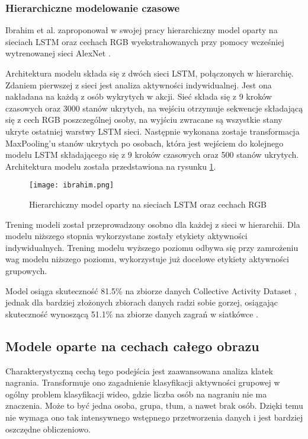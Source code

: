 \subsubsection{Hierarchiczne modelowanie czasowe} 
Ibrahim et al. \cite{Ibrahim2015} zaproponował w swojej pracy hierarchiczny model oparty na sieciach LSTM oraz cechach RGB wyekstrahowanych przy pomocy wcześniej wytrenowanej sieci AlexNet \cite{alexnet}. 

Architektura modelu składa się z dwóch sieci LSTM, połączonych w hierarchię. Zdaniem pierwszej z sieci jest analiza aktywności indywidualnej. Jest ona nakładana na każdą z osób wykrytych w akcji. Sieć składa się z 9 kroków czasowych oraz 3000 stanów ukrytych, na wejściu otrzymuje sekwencje składającą się z cech RGB poszczególnej osoby, na wyjściu zwracane są wszystkie stany ukryte ostatniej warstwy LSTM sieci. Następnie wykonana zostaje transformacja MaxPooling'u stanów ukrytych po osobach, która jest wejściem do kolejnego modelu LSTM składającego się z 9 kroków czasowych oraz 500 stanów ukrytych. Architektura modelu została przedstawiona na rysunku \ref{fig:ibrahim-arch}. 
\begin{figure}[!h]
    \centering \texttt{[image: ibrahim.png]}
    \caption{Hierarchiczny model oparty na sieciach LSTM oraz cechach RGB}
    \label{fig:ibrahim-arch}
\end{figure}
Trening modeli został przeprowadzony osobno dla każdej z sieci w hierarchii. Dla modelu niższego stopnia wykorzystane zostały etykiety aktywności indywidualnych. Trening modelu wyższego poziomu odbywa się przy zamrożeniu wag modelu niższego poziomu, wykorzystuje już docelowe etykiety aktywności grupowych. 

Model osiąga skuteczność 81.5\% na zbiorze danych Collective Activity Dataset \cite{collective_ds}, jednak dla bardziej złożonych zbiorach danych radzi sobie gorzej, osiągając skuteczność wynoszącą 51.1\% na zbiorze danych zagrań w siatkówce \cite{Ibrahim2015}.

\subsection{Modele oparte na cechach całego obrazu}
Charakterystyczną cechą tego podejścia jest zaawansowana analiza klatek nagrania. Transformuje ono zagadnienie klasyfikacji aktywności grupowej w ogólny problem klasyfikacji wideo, gdzie liczba osób na nagraniu nie ma znaczenia. Może to być jedna osoba, grupa, tłum, a nawet brak osób. Dzięki temu nie wymaga ono tak intensywnego wstępnego przetworzenia danych i jest bardziej oszczędne obliczeniowo. 

